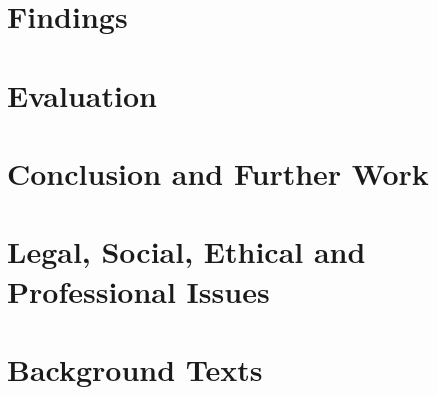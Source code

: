 \documentclass{article}
\begin{document}
\section{Findings}

\section{Evaluation}

\section{Conclusion and Further Work}

\section{Legal, Social, Ethical and Professional Issues}
\label{sec:issues}

\section{Background Texts}



\end{document}
